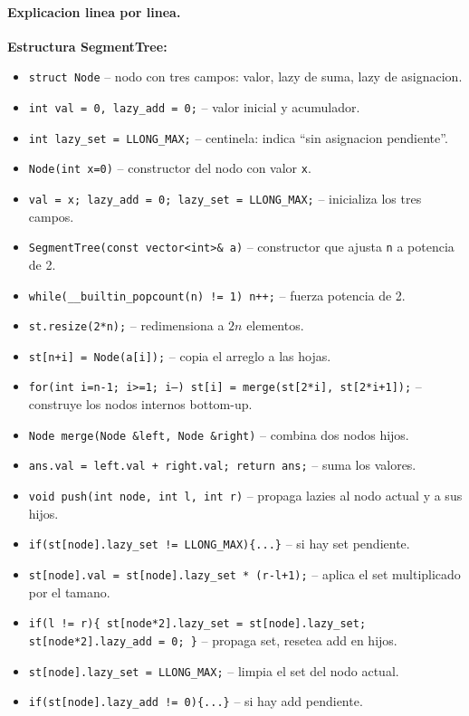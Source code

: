 \paragraph{Explicacion linea por linea.}
\textbf{Estructura SegmentTree:}
\begin{itemize}\setlength\itemsep{0pt}
	\item \texttt{struct Node} -- nodo con tres campos: valor, lazy de suma, lazy de asignacion.
	\item \texttt{int val = 0, lazy\_add = 0;} -- valor inicial y acumulador.
	\item \texttt{int lazy\_set = LLONG\_MAX;} -- centinela: indica ``sin asignacion pendiente''.
	\item \texttt{Node(int x=0)} -- constructor del nodo con valor \texttt{x}.
	\item \texttt{val = x; lazy\_add = 0; lazy\_set = LLONG\_MAX;} -- inicializa los tres campos.
	\item \texttt{SegmentTree(const vector<int>\& a)} -- constructor que ajusta \texttt{n} a potencia de 2.
	\item \texttt{while(\_\_builtin\_popcount(n) != 1) n++;} -- fuerza potencia de 2.
	\item \texttt{st.resize(2*n);} -- redimensiona a $2n$ elementos.
	\item \texttt{st[n+i] = Node(a[i]);} -- copia el arreglo a las hojas.
	\item \texttt{for(int i=n-1; i>=1; i--) st[i] = merge(st[2*i], st[2*i+1]);} -- construye los nodos internos bottom-up.
	\item \texttt{Node merge(Node \&left, Node \&right)} -- combina dos nodos hijos.
	\item \texttt{ans.val = left.val + right.val; return ans;} -- suma los valores.
	\item \texttt{void push(int node, int l, int r)} -- propaga lazies al nodo actual y a sus hijos.
	\item \texttt{if(st[node].lazy\_set != LLONG\_MAX)\{...\}} -- si hay set pendiente.
	\item \texttt{st[node].val = st[node].lazy\_set * (r-l+1);} -- aplica el set multiplicado por el tamano.
	\item \texttt{if(l != r)\{ st[node*2].lazy\_set = st[node].lazy\_set; st[node*2].lazy\_add = 0; \}} -- propaga set, resetea add en hijos.
	\item \texttt{st[node].lazy\_set = LLONG\_MAX;} -- limpia el set del nodo actual.
	\item \texttt{if(st[node].lazy\_add != 0)\{...\}} -- si hay add pendiente.

\end{itemize}
